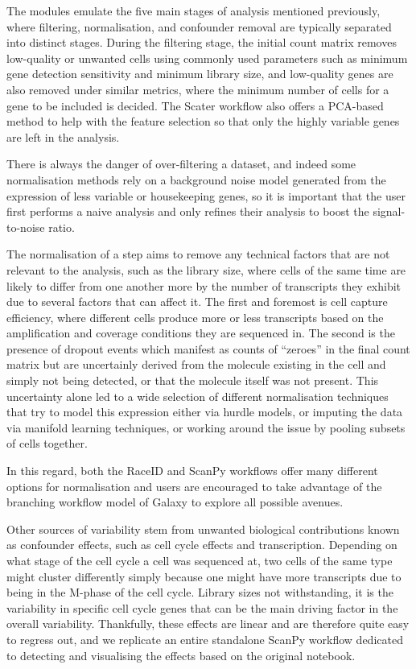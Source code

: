 \documentclass[a4paper,num-refs]{oup-contemporary}
\begin{document}
The modules emulate the five main stages of analysis mentioned previously, where filtering, normalisation, and confounder removal are typically separated into distinct stages. During the filtering stage, the initial count matrix removes low-quality or unwanted cells using commonly used parameters such as minimum gene detection sensitivity and minimum library size, and low-quality genes are also removed under similar metrics, where the minimum number of cells for a gene to be included is decided. The Scater workflow also offers a PCA-based method to help with the feature selection so that only the highly variable genes are left in the analysis.

There is always the danger of over-filtering a dataset, and indeed some normalisation methods rely on a background noise model generated from the expression of less variable or housekeeping genes, so it is important that the user first performs a naive analysis and only refines their analysis to boost the signal-to-noise ratio.

The normalisation of a step aims to remove any technical factors that are not relevant to the analysis, such as the library size, where cells of the same time are likely to differ from one another more by the number of transcripts they exhibit due to several factors that can affect it. The first and foremost is cell capture efficiency, where different cells produce more or less transcripts based on the amplification and coverage conditions they are sequenced in. The second is the presence of dropout events which manifest as counts of ``zeroes'' in the final count matrix but are uncertainly derived from the molecule existing in the cell and simply not being detected, or that the molecule itself was not present. This uncertainty alone led to a wide selection of different normalisation techniques that try to model this expression either via hurdle models, or imputing the data via manifold learning techniques, or working around the issue by pooling subsets of cells together.

In this regard, both the RaceID and ScanPy workflows offer many different options for normalisation and users are encouraged to take advantage of the branching workflow model of Galaxy to explore all possible avenues.

Other sources of variability stem from unwanted biological contributions known as confounder effects, such as cell cycle effects and transcription. Depending on what stage of the cell cycle a cell was sequenced at, two cells of the same type might cluster differently simply because one might have more transcripts due to being in the M-phase of the cell cycle. Library sizes not withstanding, it is the variability in specific cell cycle genes that can be the main driving factor in the overall variability. Thankfully, these effects are linear and are therefore quite easy to regress out, and we replicate an entire standalone ScanPy workflow dedicated to detecting and visualising the effects based on the original notebook.
\end{document}
